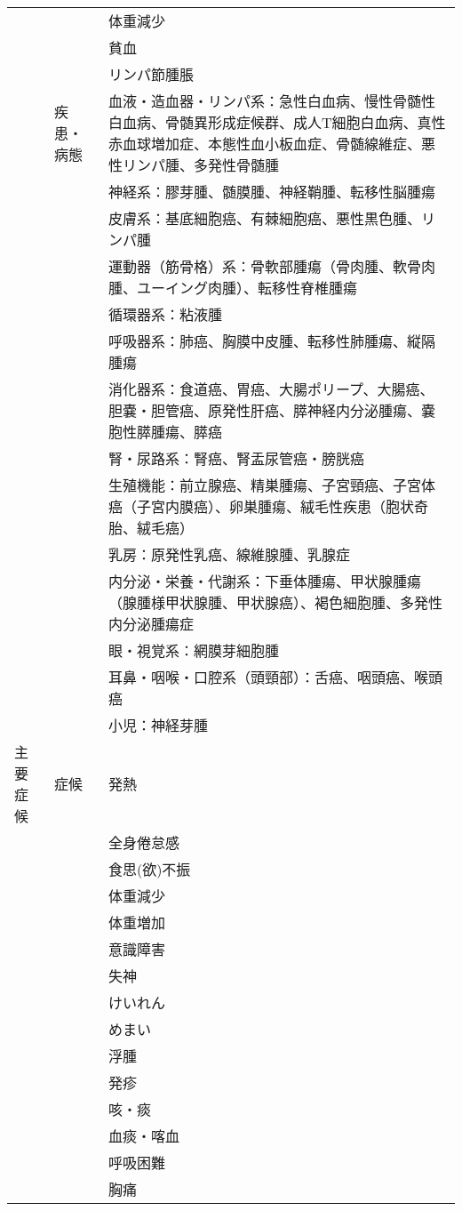 \begin{xltabular}{\linewidth}{XXX}
 &  & 体重減少 \\
 &  & 貧血 \\
 &  & リンパ節腫脹 \\
 & 疾患・病態 & 血液・造血器・リンパ系：急性白血病、慢性骨髄性白血病、骨髄異形成症候群、成人T細胞白血病、真性赤血球増加症、本態性血小板血症、骨髄線維症、悪性リンパ腫、多発性骨髄腫 \\
 &  & 神経系：膠芽腫、髄膜腫、神経鞘腫、転移性脳腫瘍 \\
 &  & 皮膚系：基底細胞癌、有棘細胞癌、悪性黒色腫、リンパ腫 \\
 &  & 運動器（筋骨格）系：骨軟部腫瘍（骨肉腫、軟骨肉腫、ユーイング肉腫）、転移性脊椎腫瘍 \\
 &  & 循環器系：粘液腫 \\
 &  & 呼吸器系：肺癌、胸膜中皮腫、転移性肺腫瘍、縦隔腫瘍 \\
 &  & 消化器系：食道癌、胃癌、大腸ポリープ、大腸癌、胆嚢・胆管癌、原発性肝癌、膵神経内分泌腫瘍、嚢胞性膵腫瘍、膵癌 \\
 &  & 腎・尿路系：腎癌、腎盂尿管癌・膀胱癌 \\
 &  & 生殖機能：前立腺癌、精巣腫瘍、子宮頸癌、子宮体癌（子宮内膜癌）、卵巣腫瘍、絨毛性疾患（胞状奇胎、絨毛癌） \\
 &  & 乳房：原発性乳癌、線維腺腫、乳腺症 \\
 &  & 内分泌・栄養・代謝系：下垂体腫瘍、甲状腺腫瘍（腺腫様甲状腺腫、甲状腺癌）、褐色細胞腫、多発性内分泌腫瘍症 \\
 &  & 眼・視覚系：網膜芽細胞腫 \\
 &  & 耳鼻・咽喉・口腔系（頭頸部）：舌癌、咽頭癌、喉頭癌 \\
 &  & 小児：神経芽腫 \\
主要症候 & 症候 & 発熱 \\
 &  & 全身倦怠感 \\
 &  & 食思(欲)不振 \\
 &  & 体重減少 \\
 &  & 体重増加 \\
 &  & 意識障害 \\
 &  & 失神 \\
 &  & けいれん \\
 &  & めまい \\
 &  & 浮腫 \\
 &  & 発疹 \\
 &  & 咳・痰 \\
 &  & 血痰・喀血 \\
 &  & 呼吸困難 \\
 &  & 胸痛 \\

\end{xltabular}
